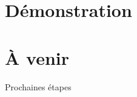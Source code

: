 \documentclass{beamer}
\begin{document}

\section{Démonstration}

\begin{frame}{\secname}
	\begin{figure}
	\end{figure}
\end{frame}



\section{À venir}

\begin{frame}{\secname}
		Prochaines étapes
\end{frame}
\end{document}
